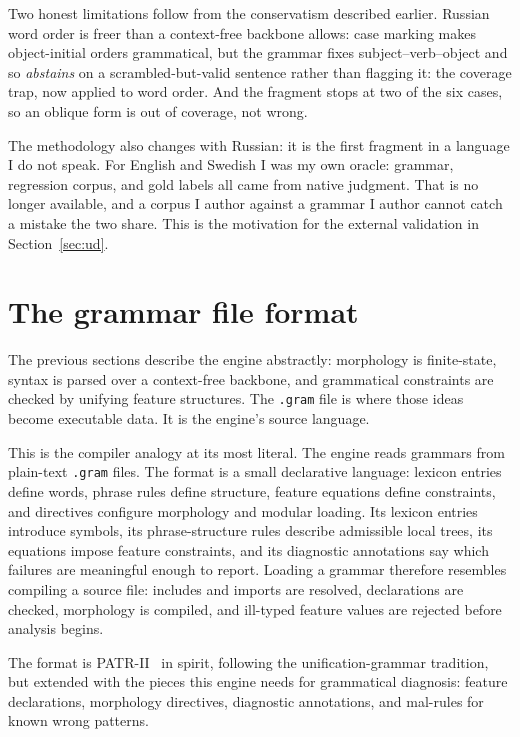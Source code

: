 \documentclass[11pt]{article}
\theoremstyle{definition}
\theoremstyle{plain}
\theoremstyle{remark}
\begin{document}
Two honest limitations follow from the conservatism described earlier. Russian word order is
freer than a context-free backbone allows: case marking makes object-initial orders
grammatical, but the grammar fixes subject--verb--object and so \emph{abstains} on a
scrambled-but-valid sentence rather than flagging it: the coverage trap, now applied to
word order. And the fragment stops at two of the six cases, so an oblique form is out of
coverage, not wrong.

The methodology also changes with Russian: it is the first fragment in a language I do not
speak. For English and Swedish I was my own oracle: grammar, regression corpus, and gold
labels all came from native judgment. That is no longer available, and a corpus I author
against a grammar I author cannot catch a mistake the two share. This is the motivation for
the external validation in Section~\ref{sec:ud}.

\section{The grammar file format}
\label{sec:format}

The previous sections describe the engine abstractly: morphology is finite-state,
syntax is parsed over a context-free backbone, and grammatical constraints are
checked by unifying feature structures. The \texttt{.gram} file is where those
ideas become executable data. It is the engine's source language.

This is the compiler analogy at its most literal. The engine reads grammars from plain-text \texttt{.gram} files. The format is a small
declarative language: lexicon entries define words, phrase rules define structure, feature
equations define constraints, and directives configure morphology and modular loading. Its lexicon entries introduce symbols, its phrase-structure
rules describe admissible local trees, its equations impose feature constraints,
and its diagnostic annotations say which failures are meaningful enough to
report. Loading a grammar therefore resembles compiling a source file: includes
and imports are resolved, declarations are checked, morphology is compiled, and
ill-typed feature values are rejected before analysis begins.

The format is PATR-II~\cite{shieber1984patr} in spirit, following the
unification-grammar tradition, but extended with the pieces this engine needs
for grammatical diagnosis:
feature declarations, morphology directives, diagnostic annotations, and
mal-rules for known wrong patterns.
\end{document}
